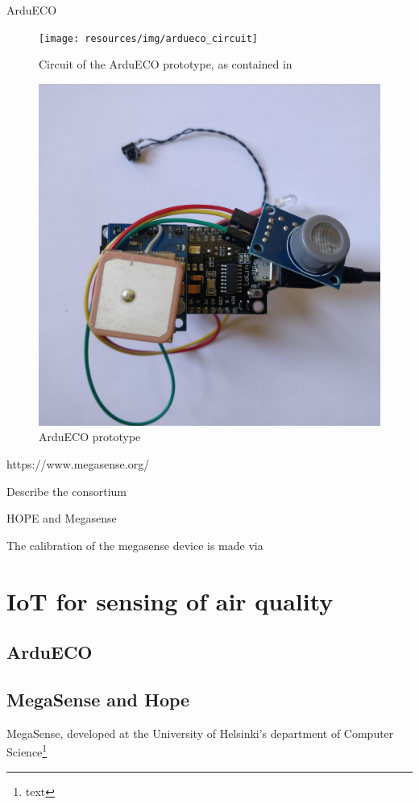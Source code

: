 
ArduECO

\begin{figure}
	\centering
	\texttt{[image: resources/img/ardueco\_circuit]}
	\caption{Circuit of the ArduECO prototype, as contained in \cite{ardueco_paper}}
\end{figure}

\begin{figure}
	\centering
	\includegraphics[width=.5\textwidth]{resources/img/ardueco_picture}
	\caption{ArduECO prototype}
\end{figure}


https://www.megasense.org/

Describe the consortium

HOPE and Megasense

The calibration of the megasense device is made via

\newpage
\section{IoT for sensing of air quality}

\subsection{ArduECO}

\subsection{MegaSense and Hope}

	MegaSense, developed at the University of Helsinki's department of Computer Science\footnote{text}